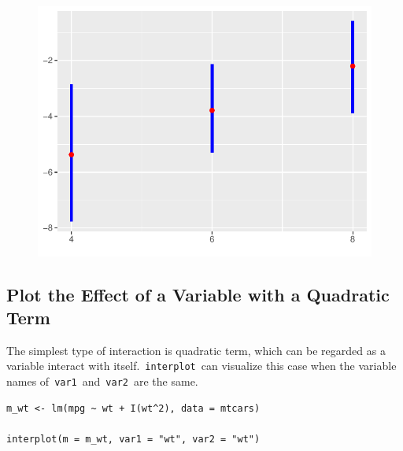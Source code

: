 \documentclass[
  article]{jss}
\begin{document}
\begin{figure}[H]

{\centering \includegraphics{jss_manuscript_files/figure-pdf/unnamed-chunk-8-1.pdf}

}

\end{figure}

\hypertarget{plot-the-effect-of-a-variable-with-a-quadratic-term}{%
\subsection{Plot the Effect of a Variable with a Quadratic
Term}\label{plot-the-effect-of-a-variable-with-a-quadratic-term}}

The simplest type of interaction is quadratic term, which can be
regarded as a variable interact with itself.~\texttt{interplot}~can
visualize this case when the variable names
of~\texttt{var1}~and~\texttt{var2}~are the same.

\begin{verbatim}
m_wt <- lm(mpg ~ wt + I(wt^2), data = mtcars)

interplot(m = m_wt, var1 = "wt", var2 = "wt")
\end{verbatim}
\end{document}
